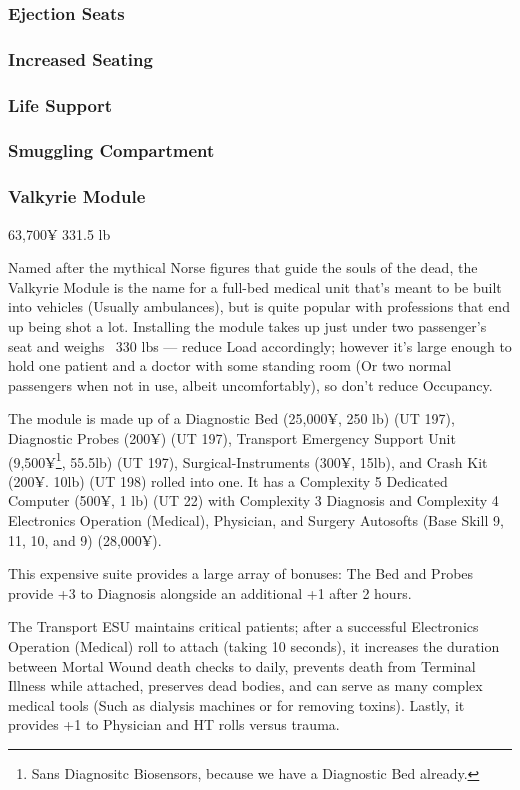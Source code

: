 \begin{multicols*}{2}
	\subsubsection{Ejection Seats}
	
	\subsubsection{Increased Seating}
	
	\subsubsection{Life Support}
	
	\subsubsection{Smuggling Compartment}
	
	\subsubsection{Valkyrie Module}
	63,700¥ 331.5 lb
	
	Named after the mythical Norse figures that guide the souls of the dead, the Valkyrie Module is the name for a full-bed medical unit that's meant to be built into vehicles (Usually ambulances), but is quite popular with professions that end up being shot a lot. Installing the module takes up just under two passenger's seat and weighs ~330 lbs — reduce Load accordingly; however it's large enough to hold one patient and a doctor with some standing room (Or two normal passengers when not in use, albeit uncomfortably), so don't reduce Occupancy.
	
	The module is made up of a Diagnostic Bed (25,000¥, 250 lb) (UT 197), Diagnostic Probes (200¥) (UT 197), Transport Emergency Support Unit (9,500¥\footnote{Sans Diagnositc Biosensors, because we have a Diagnostic Bed already.}, 55.5lb) (UT 197), Surgical-Instruments (300¥, 15lb), and Crash Kit (200¥. 10lb) (UT 198) rolled into one. It has a Complexity 5 Dedicated Computer (500¥, 1 lb) (UT 22) with Complexity 3 Diagnosis and Complexity 4 Electronics Operation (Medical), Physician, and Surgery Autosofts (Base Skill 9, 11, 10, and 9) (28,000¥). 
	
	This expensive suite provides a large array of bonuses: The Bed and Probes provide +3 to Diagnosis alongside an additional +1 after 2 hours. 
	
	The Transport ESU maintains critical patients; after a successful Electronics Operation (Medical) roll to attach (taking 10 seconds), it increases the duration between Mortal Wound death checks to daily, prevents death from Terminal Illness while attached, preserves dead bodies, and can serve as many complex medical tools (Such as dialysis machines or for removing toxins). Lastly, it provides +1 to Physician and HT rolls versus trauma.
	

\end{multicols*}
